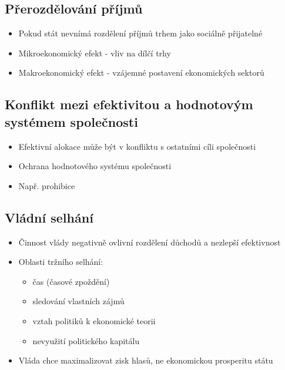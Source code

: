 \subsection{Přerozdělování příjmů}
\begin{itemize}
    \item Pokud stát nevnímá rozdělení příjmů trhem jako sociálně přijatelné
    \item Mikroekonomický efekt - vliv na dílčí trhy
    \item Makroekonomický efekt - vzájemné postavení ekonomických sektorů
\end{itemize}

\subsection{Konflikt mezi efektivitou a hodnotovým systémem společnosti}
\begin{itemize}
    \item Efektivní alokace může být v konfliktu s ostatními cíli společnosti
    \item Ochrana hodnotového  systému společnosti
    \item Např. prohibice
\end{itemize}

\subsection{Vládní selhání}
\begin{itemize}
    \item Činnost vlády negativně ovlivní rozdělení důchodů a nezlepší efektivnost
    \item Oblasti tržního selhání:
    \begin{itemize}
        \item čas (časové zpoždění)
        \item sledování vlastních zájmů
        \item vztah politiků k ekonomické teorii
        \item nevyužití politického kapitálu
    \end{itemize}
    \item Vláda chce maximalizovat zisk hlasů, ne ekonomickou prosperitu státu
\end{itemize}